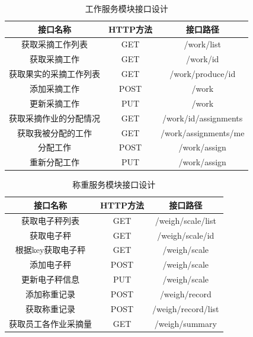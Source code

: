 \begin{table}[H]
\centering
\begin{tabular}{|c|c|c|}
\hline
\textbf{接口名称} & \textbf{HTTP方法} & \textbf{接口路径} \\
\hline
获取采摘工作列表 & GET & /work/list \\
\hline
获取采摘工作 & GET & /work/{id} \\
\hline
获取果实的采摘工作列表 & GET & /work/produce/{id} \\
\hline
添加采摘工作 & POST & /work \\
\hline
更新采摘工作 & PUT & /work \\
\hline
获取采摘作业的分配情况 & GET & /work/{id}/assignments \\
\hline
获取我被分配的工作 & GET & /work/assignments/me \\
\hline
分配工作 & POST & /work/assign \\
\hline
重新分配工作 & PUT & /work/assign \\
\hline
\end{tabular}%

\caption{工作服务模块接口设计}
\label{tab:工作服务模块接口设计}
\end{table}

\begin{table}[H]
\centering
\begin{tabular}{|c|c|c|}
\hline
\textbf{接口名称} & \textbf{HTTP方法} & \textbf{接口路径} \\
\hline
获取电子秤列表 & GET & /weigh/scale/list \\
\hline
获取电子秤 & GET & /weigh/scale/{id} \\
\hline
根据key获取电子秤 & GET & /weigh/scale \\
\hline
添加电子秤 & POST & /weigh/scale \\
\hline
更新电子秤信息 & PUT & /weigh/scale \\
\hline
添加称重记录 & POST & /weigh/record \\
\hline
获取称重记录 & POST & /weigh/record/list \\
\hline
获取员工各作业采摘量 & GET & /weigh/summary \\
\hline
\end{tabular}%

\caption{称重服务模块接口设计}
\label{tab:称重服务模块接口设计}
\end{table}


